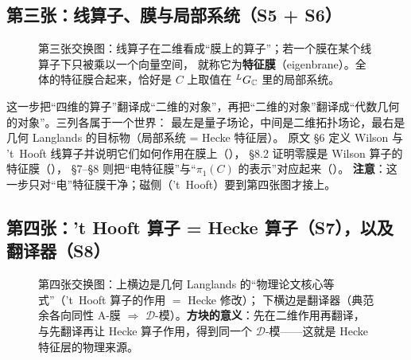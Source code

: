 \subsection{第三张：线算子、膜与局部系统（S5 + S6）}

\begin{figure}[htbp]
\centering
{}
\caption{第三张交换图：线算子在二维看成“膜上的算子”；若一个膜在某个线算子下只被乘以一个向量空间，
就称它为\textbf{特征膜}（eigenbrane）。全体的特征膜合起来，恰好是 $C$ 上取值在 ${}^{L}G_{\mathbb{C}}$ 里的局部系统。}
\label{fig:concept-3}
\end{figure}

这一步把“四维的算子”翻译成“二维的对象”，再把“二维的对象”翻译成“代数几何的对象”。三列各属于一个世界：
最左是量子场论，中间是二维拓扑场论，最右是几何 Langlands 的目标物（局部系统 = Hecke 特征层）。
原文 \S6 定义 Wilson 与 't~Hooft 线算子并说明它们如何作用在膜上（），
\S8.2 证明零膜是 Wilson 算子的特征膜（），
\S7--\S8 则把“电特征膜”与“$\pi_1(C)$ 的表示”对应起来（）。
\textbf{注意}：这一步只对“电”特征膜干净；磁侧（'t~Hooft）要到第四张图才接上。

\subsection{第四张：'t Hooft 算子 = Hecke 算子（S7），以及翻译器（S8）}

\begin{figure}[htbp]
\centering
{}
\caption{第四张交换图：上横边是几何 Langlands 的“物理论文核心等式”（'t~Hooft 算子的作用 $=$ Hecke 修改）；
下横边是翻译器（典范余各向同性 A-膜 $\Rightarrow$ $\mathcal{D}$-模）。\textbf{方块的意义}：先在二维作用再翻译，
与先翻译再让 Hecke 算子作用，得到同一个 $\mathcal{D}$-模——这就是 Hecke 特征层的物理来源。}
\label{fig:concept-4}
\end{figure}

